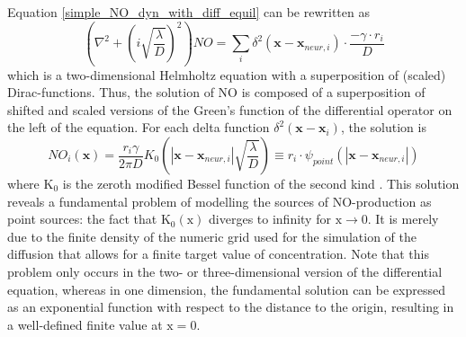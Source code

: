 \documentclass[10pt,a4paper]{article}
\begin{document}
Equation \eqref{simple_NO_dyn_with_diff_equil} can be rewritten as
\begin{equation}
\left(\nabla^2 + \left( i\sqrt{\frac{\lambda}{D}}\right)^2\right) NO = \sum_{i} \delta^2(\mathbf{x}-\mathbf{x}_{neur,i})\cdot \frac{- \gamma \cdot r_i}{D}
\label{simple_NO_dyn_with_diff_equil_helmholtz}
\end{equation}
which is a two-dimensional Helmholtz equation with a superposition of (scaled) Dirac-functions. Thus, the solution of $\mathrm{NO}$ is composed of a superposition of shifted and scaled versions of the Green's function of the differential operator on the left of the equation. For each delta function $\delta^2(\mathbf{x}-\mathbf{x}_i)$, the solution is
\begin{equation}
NO_i(\mathbf{x}) = \frac{r_i \gamma}{2 \pi D} K_0 \left(|\mathbf{x}-\mathbf{x}_{neur,i}|\sqrt{\frac{\lambda}{D}} \right) \equiv r_i \cdot \psi_{point}(|\mathbf{x}-\mathbf{x}_{neur,i}|)
\label{solution_diff_equil_bessel}
\end{equation}
where $\mathrm{K_0}$ is the zeroth modified Bessel function of the second kind \cite{Helmholtz_Solution_2d}. This solution reveals a fundamental problem of modelling the sources of $\mathrm{NO}$-production as point sources: the fact that $\mathrm{K_0(x)}$ diverges to infinity for $\mathrm{x\rightarrow 0}$. It is merely due to the finite density of the numeric grid used for the simulation of the diffusion that allows for a finite target value of concentration. Note that this problem only occurs in the two- or three-dimensional version of the differential equation, whereas in one dimension, the fundamental solution can be expressed as an exponential function with respect to the distance to the origin, resulting in a well-defined finite value at $\mathrm{x=0}$.
\end{document}
